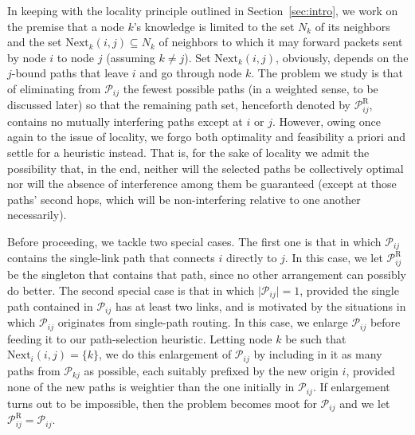 \documentclass{article}
\begin{document}
In keeping with the locality principle outlined in Section~\ref{sec:intro}, we
work on the premise that a node $k$'s knowledge is limited to the set $N_k$ of
its neighbors and the set $\mathrm{Next}_k(i,j)\subseteq N_k$ of neighbors to
which it may forward packets sent by node $i$ to node $j$ (assuming $k\neq j$).
Set $\mathrm{Next}_k(i,j)$, obviously, depends on the $j$-bound paths that leave
$i$ and go through node $k$. The problem we study is that of eliminating from
$\mathcal{P}_{ij}$ the fewest possible paths (in a weighted sense, to be
discussed later) so that the remaining path set, henceforth denoted by
$\mathcal{P}^\mathrm{R}_{ij}$, contains no mutually interfering paths except at
$i$ or $j$. However, owing once again to the issue of locality, we forgo both
optimality and feasibility a priori and settle for a heuristic instead. That is,
for the sake of locality we admit the possibility that, in the end, neither will
the selected paths be collectively optimal nor will the absence of interference
among them be guaranteed (except at those paths' second hops, which will be
non-interfering relative to one another necessarily).

Before proceeding, we tackle two special cases. The first one is that in which
$\mathcal{P}_{ij}$ contains the single-link path that connects $i$ directly to
$j$. In this case, we let $\mathcal{P}^\mathrm{R}_{ij}$ be the singleton that
contains that path, since no other arrangement can possibly do better. The
second special case is that in which $\vert\mathcal{P}_{ij}\vert=1$, provided
the single path contained in $\mathcal{P}_{ij}$ has at least two links, and is
motivated by the situations in which $\mathcal{P}_{ij}$ originates from
single-path routing. In this case, we enlarge $\mathcal{P}_{ij}$ before feeding
it to our path-selection heuristic. Letting node $k$ be such that
$\mathrm{Next}_i(i,j)=\{k\}$, we do this enlargement of $\mathcal{P}_{ij}$ by
including in it as many paths from $\mathcal{P}_{kj}$ as possible, each suitably
prefixed by the new origin $i$, provided none of the new paths is weightier than
the one initially in $\mathcal{P}_{ij}$. If enlargement turns out to be
impossible, then the problem becomes moot for $\mathcal{P}_{ij}$ and we let
$\mathcal{P}^\mathrm{R}_{ij}=\mathcal{P}_{ij}$.
\end{document}
